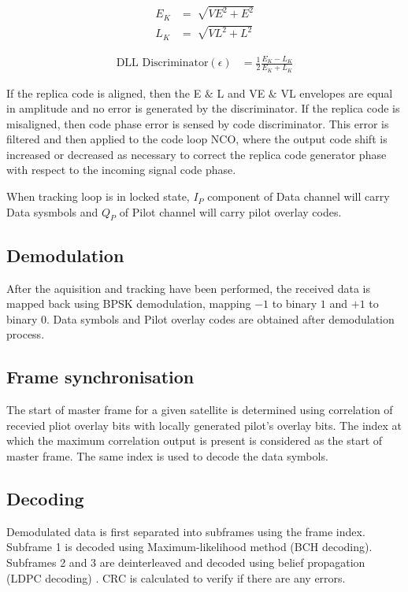 \documentclass[conference]{IEEEtran}
\begin{document}
\begin{align}
	E_K&=\sqrt[]{VE^2+E^2}\\
	L_K&=\sqrt[]{VL^2+L^2}
\end{align}

\begin{align}
	\text{DLL Discriminator} (\epsilon)&=\frac{1}{2}\frac{E_K-L_K}{E_K+L_K}
\end{align}

\noindent If the replica code is aligned, then the E $\&$ L and VE $\&$ VL envelopes are equal in 
amplitude and no error is generated by the discriminator. If the replica code is misaligned, then 
code phase error is sensed by code discriminator. This error is filtered and 
then applied to the code loop NCO, where the output code shift is increased or decreased as 
necessary to correct the replica code generator phase with respect to the incoming  signal code 
phase.

\noindent When tracking loop is in locked state, $I_P$ component of Data channel will carry Data 
sysmbols and $Q_P$ of Pilot channel will carry pilot overlay codes.

\subsection{Demodulation}
After the aquisition and tracking have been performed, the received data is mapped back using BPSK 
demodulation, mapping $-1$ to binary $1$ and $+1$ to binary $0$. Data symbols and Pilot 
overlay codes are obtained after demodulation process.

\subsection{Frame synchronisation}
The start of master frame for a given satellite is determined using correlation of 
recevied pliot overlay bits with locally generated pilot's overlay bits. The index at which the 
maximum correlation output is present is considered as the start of master frame. The same
index is used to decode the data symbols.

\subsection{Decoding}
Demodulated data is first separated into subframes using the frame index. Subframe 1 is decoded 
using Maximum-likelihood method (BCH decoding). Subframes 2 and 3 are deinterleaved and decoded 
using belief propagation (LDPC decoding) \cite{b6}. CRC is calculated to verify if there are any errors. 
\end{document}
